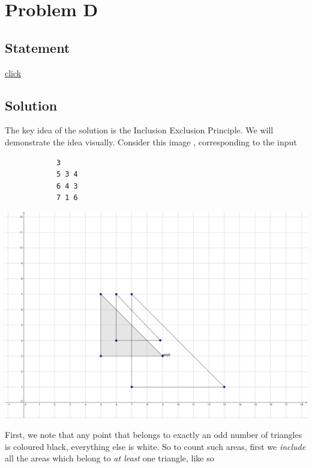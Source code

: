\section{Problem D}
    \subsection{Statement}
        \href{http://foobar.iiitd.edu.in/contest/team/problem.php?id=530}{click}

    \subsection{Solution}
        The key idea of the solution is the Inclusion Exclusion Principle.
        We will demonstrate the idea visually.
        Consider this image
        , corresponding to the input
        \begin{verbatim}
            3
            5 3 4
            6 4 3
            7 1 6
        \end{verbatim}

        \begin{center}
            \includegraphics[scale=0.2]{images/input.png}
        \end{center}

        First, we note that any point that belongs to exactly an odd number of triangles
        is coloured black, everything else is white.
        So to count such areas, first we \emph{include} all the areas which belong to
        \emph{at least} one triangle, like so

